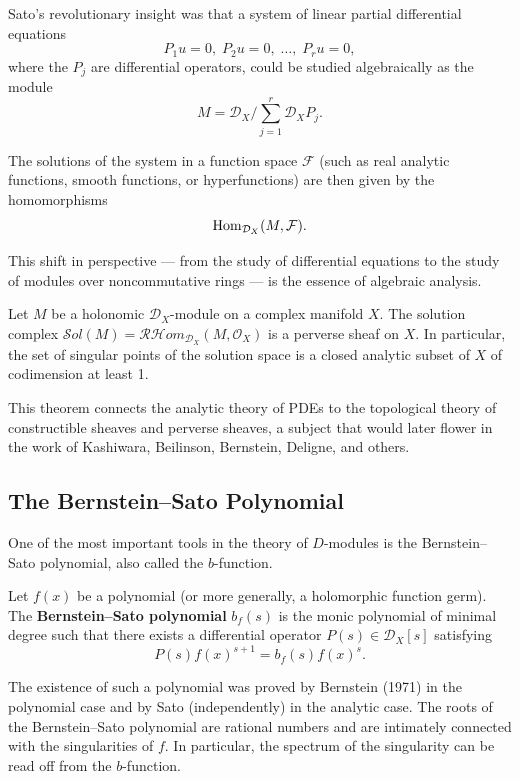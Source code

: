 Sato's revolutionary insight was that a system of linear partial differential equations
\[
P_1 u = 0,\; P_2 u = 0,\; \dots,\; P_r u = 0,
\]
where the \(P_j\) are differential operators, could be studied algebraically as the module
\[
M = \mathcal{D}_X / \sum_{j=1}^r \mathcal{D}_X P_j.
\]

The solutions of the system in a function space \(\mathcal{F}\) (such as real analytic functions, smooth functions, or hyperfunctions) are then given by the homomorphisms
\[
\operatorname{Hom}_{\mathcal{D}_X}(M, \mathcal{F}).
\]

This shift in perspective --- from the study of differential equations to the study of modules over noncommutative rings --- is the essence of algebraic analysis.

\begin{theorem}[Sato, 1970]
Let \(M\) be a holonomic \(\mathcal{D}_X\)-module on a complex manifold \(X\). The solution complex \(\mathcal{S}ol(M) = \mathcal{R}\mathcal{H}om_{\mathcal{D}_X}(M, \mathcal{O}_X)\) is a perverse sheaf on \(X\). In particular, the set of singular points of the solution space is a closed analytic subset of \(X\) of codimension at least 1.
\end{theorem}

This theorem connects the analytic theory of PDEs to the topological theory of constructible sheaves and perverse sheaves, a subject that would later flower in the work of Kashiwara, Beilinson, Bernstein, Deligne, and others.

\subsection{The Bernstein--Sato Polynomial}

One of the most important tools in the theory of \(D\)-modules is the Bernstein--Sato polynomial, also called the \(b\)-function.

\begin{definition}
Let \(f(x)\) be a polynomial (or more generally, a holomorphic function germ). The \textbf{Bernstein--Sato polynomial} \(b_f(s)\) is the monic polynomial of minimal degree such that there exists a differential operator \(P(s) \in \mathcal{D}_X[s]\) satisfying
\[
P(s) f(x)^{s+1} = b_f(s) f(x)^s.
\]
\end{definition}

The existence of such a polynomial was proved by Bernstein (1971) in the polynomial case and by Sato (independently) in the analytic case. The roots of the Bernstein--Sato polynomial are rational numbers and are intimately connected with the singularities of \(f\). In particular, the spectrum of the singularity can be read off from the \(b\)-function.


